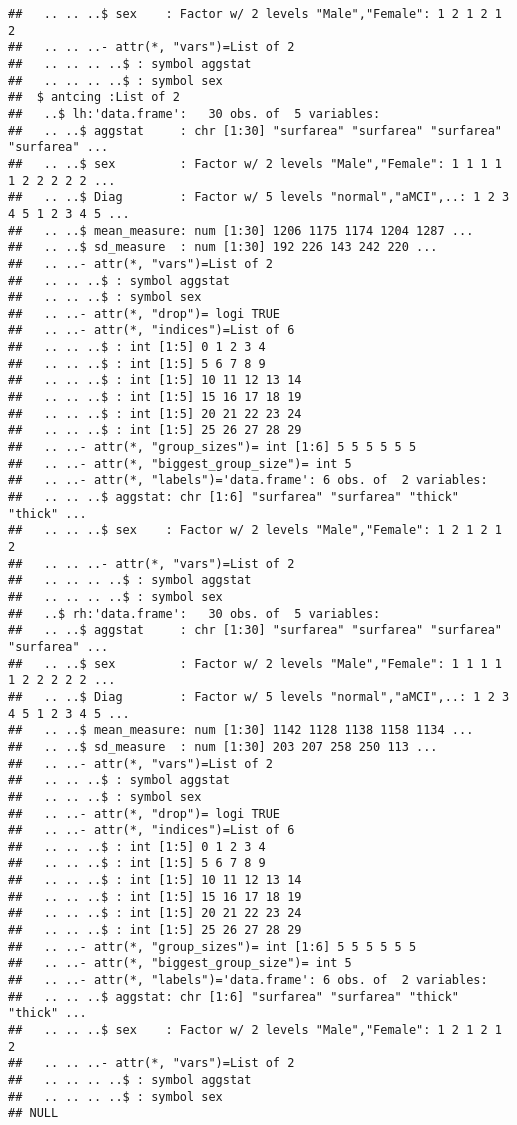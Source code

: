 \documentclass[12pt]{article}
\begin{document}
\begin{knitrout}
\begin{kframe}
\begin{verbatim}
##   .. .. ..$ sex    : Factor w/ 2 levels "Male","Female": 1 2 1 2 1 2
##   .. .. ..- attr(*, "vars")=List of 2
##   .. .. .. ..$ : symbol aggstat
##   .. .. .. ..$ : symbol sex
##  $ antcing :List of 2
##   ..$ lh:'data.frame':	30 obs. of  5 variables:
##   .. ..$ aggstat     : chr [1:30] "surfarea" "surfarea" "surfarea" "surfarea" ...
##   .. ..$ sex         : Factor w/ 2 levels "Male","Female": 1 1 1 1 1 2 2 2 2 2 ...
##   .. ..$ Diag        : Factor w/ 5 levels "normal","aMCI",..: 1 2 3 4 5 1 2 3 4 5 ...
##   .. ..$ mean_measure: num [1:30] 1206 1175 1174 1204 1287 ...
##   .. ..$ sd_measure  : num [1:30] 192 226 143 242 220 ...
##   .. ..- attr(*, "vars")=List of 2
##   .. .. ..$ : symbol aggstat
##   .. .. ..$ : symbol sex
##   .. ..- attr(*, "drop")= logi TRUE
##   .. ..- attr(*, "indices")=List of 6
##   .. .. ..$ : int [1:5] 0 1 2 3 4
##   .. .. ..$ : int [1:5] 5 6 7 8 9
##   .. .. ..$ : int [1:5] 10 11 12 13 14
##   .. .. ..$ : int [1:5] 15 16 17 18 19
##   .. .. ..$ : int [1:5] 20 21 22 23 24
##   .. .. ..$ : int [1:5] 25 26 27 28 29
##   .. ..- attr(*, "group_sizes")= int [1:6] 5 5 5 5 5 5
##   .. ..- attr(*, "biggest_group_size")= int 5
##   .. ..- attr(*, "labels")='data.frame':	6 obs. of  2 variables:
##   .. .. ..$ aggstat: chr [1:6] "surfarea" "surfarea" "thick" "thick" ...
##   .. .. ..$ sex    : Factor w/ 2 levels "Male","Female": 1 2 1 2 1 2
##   .. .. ..- attr(*, "vars")=List of 2
##   .. .. .. ..$ : symbol aggstat
##   .. .. .. ..$ : symbol sex
##   ..$ rh:'data.frame':	30 obs. of  5 variables:
##   .. ..$ aggstat     : chr [1:30] "surfarea" "surfarea" "surfarea" "surfarea" ...
##   .. ..$ sex         : Factor w/ 2 levels "Male","Female": 1 1 1 1 1 2 2 2 2 2 ...
##   .. ..$ Diag        : Factor w/ 5 levels "normal","aMCI",..: 1 2 3 4 5 1 2 3 4 5 ...
##   .. ..$ mean_measure: num [1:30] 1142 1128 1138 1158 1134 ...
##   .. ..$ sd_measure  : num [1:30] 203 207 258 250 113 ...
##   .. ..- attr(*, "vars")=List of 2
##   .. .. ..$ : symbol aggstat
##   .. .. ..$ : symbol sex
##   .. ..- attr(*, "drop")= logi TRUE
##   .. ..- attr(*, "indices")=List of 6
##   .. .. ..$ : int [1:5] 0 1 2 3 4
##   .. .. ..$ : int [1:5] 5 6 7 8 9
##   .. .. ..$ : int [1:5] 10 11 12 13 14
##   .. .. ..$ : int [1:5] 15 16 17 18 19
##   .. .. ..$ : int [1:5] 20 21 22 23 24
##   .. .. ..$ : int [1:5] 25 26 27 28 29
##   .. ..- attr(*, "group_sizes")= int [1:6] 5 5 5 5 5 5
##   .. ..- attr(*, "biggest_group_size")= int 5
##   .. ..- attr(*, "labels")='data.frame':	6 obs. of  2 variables:
##   .. .. ..$ aggstat: chr [1:6] "surfarea" "surfarea" "thick" "thick" ...
##   .. .. ..$ sex    : Factor w/ 2 levels "Male","Female": 1 2 1 2 1 2
##   .. .. ..- attr(*, "vars")=List of 2
##   .. .. .. ..$ : symbol aggstat
##   .. .. .. ..$ : symbol sex
## NULL
\end{verbatim}
\end{kframe}
\end{knitrout}
\end{document}
